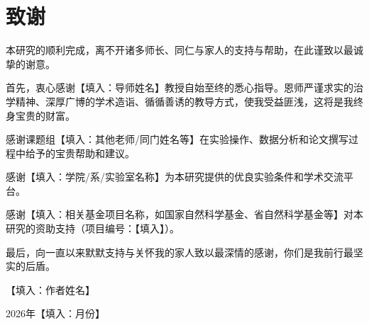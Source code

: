 \documentclass[12pt,a4paper,UTF8,openany]{ctexbook}
\begin{document}
\chapter*{致\quad 谢}

本研究的顺利完成，离不开诸多师长、同仁与家人的支持与帮助，在此谨致以最诚挚的谢意。

首先，衷心感谢【填入：导师姓名】教授自始至终的悉心指导。恩师严谨求实的治学精神、深厚广博的学术造诣、循循善诱的教导方式，使我受益匪浅，这将是我终身宝贵的财富。

感谢课题组【填入：其他老师/同门姓名等】在实验操作、数据分析和论文撰写过程中给予的宝贵帮助和建议。

感谢【填入：学院/系/实验室名称】为本研究提供的优良实验条件和学术交流平台。

感谢【填入：相关基金项目名称，如国家自然科学基金、省自然科学基金等】对本研究的资助支持（项目编号：【填入】）。

最后，向一直以来默默支持与关怀我的家人致以最深情的感谢，你们是我前行最坚实的后盾。

\vspace{2em}
\hfill【填入：作者姓名】

\hfill 2026年【填入：月份】
\end{document}
